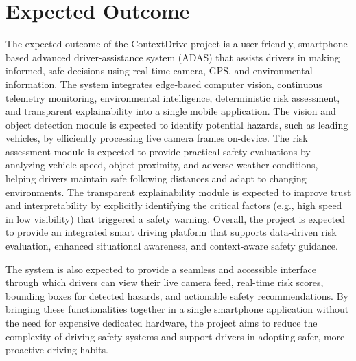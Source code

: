 \chapter{Expected Outcome}

The expected outcome of the ContextDrive project is a user-friendly, smartphone-based advanced driver-assistance system (ADAS) that assists drivers in making informed, safe decisions using real-time camera, GPS, and environmental information. The system integrates edge-based computer vision, continuous telemetry monitoring, environmental intelligence, deterministic risk assessment, and transparent explainability into a single mobile application. The vision and object detection module is expected to identify potential hazards, such as leading vehicles, by efficiently processing live camera frames on-device. The risk assessment module is expected to provide practical safety evaluations by analyzing vehicle speed, object proximity, and adverse weather conditions, helping drivers maintain safe following distances and adapt to changing environments. The transparent explainability module is expected to improve trust and interpretability by explicitly identifying the critical factors (e.g., high speed in low visibility) that triggered a safety warning. Overall, the project is expected to provide an integrated smart driving platform that supports data-driven risk evaluation, enhanced situational awareness, and context-aware safety guidance.

The system is also expected to provide a seamless and accessible interface through which drivers can view their live camera feed, real-time risk scores, bounding boxes for detected hazards, and actionable safety recommendations. By bringing these functionalities together in a single smartphone application without the need for expensive dedicated hardware, the project aims to reduce the complexity of driving safety systems and support drivers in adopting safer, more proactive driving habits.